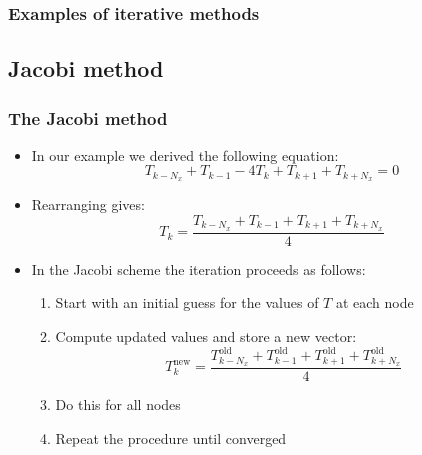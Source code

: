 \begin{frame}[fragile]
  \frametitle{Examples of iterative methods}
\end{frame}

\subsection*{Jacobi method}
\begin{frame}[fragile]
  \frametitle{The Jacobi method}
  \begin{itemize}
     \item In our example we derived the following equation:
    \[
     T_{k-N_x} + T_{k-1} - 4T_k + T_{k+1} + T_{k+N_x} = 0
    \]
    \item Rearranging gives:
    \[
      T_k = \frac{T_{k-N_x} + T_{k-1} + T_{k+1} + T_{k+N_x}}{4}
    \]\pause
    \item In the Jacobi scheme the iteration proceeds as follows:
    \begin{enumerate}
      \item Start with an initial guess for the values of $T$ at each node\pause
      \item Compute updated values and store a new vector:
        \[
          T_k^\text{new} = \frac{T_{k-N_x}^\text{old} + T_{k-1}^\text{old} + T_{k+1}^\text{old} + T_{k+N_x}^\text{old}}{4}
        \]\pause
      \item Do this for all nodes\pause
      \item Repeat the procedure until converged
    \end{enumerate}
  \end{itemize}
\end{frame}

